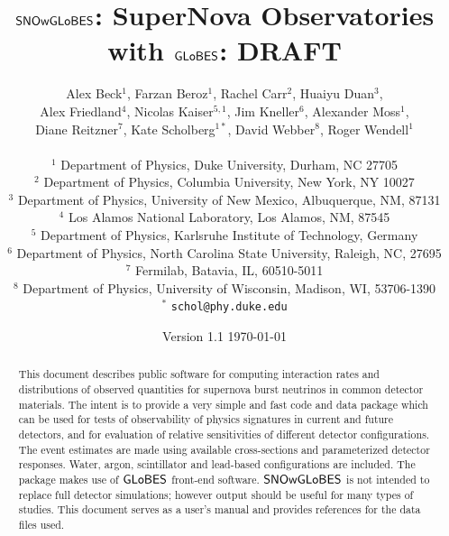 \documentclass[12pt]{article}
\newcommand{\globes}{\sf{GLoBES}}
\newcommand{\snowglobes}{\sf{SNOwGLoBES}}
\begin{document}
\title{\bf $\snowglobes$: SuperNova Observatories with $\globes$: DRAFT}
\author{Alex Beck$^1$,
Farzan Beroz$^1$,
Rachel Carr$^2$,
Huaiyu Duan$^3$,\\
Alex Friedland$^4$,
Nicolas Kaiser$^{5,1}$,
Jim Kneller$^6$,
Alexander Moss$^1$,\\
Diane Reitzner$^7$,
Kate Scholberg$^{1*}$,
David Webber$^8$,
Roger Wendell$^1$\\
~\\
\small
$^1$ Department of Physics, Duke University, Durham, NC 27705\\
\small
$^2$ Department of Physics, Columbia University, New York, NY 10027\\
\small
$^3$ Department of Physics, University of New Mexico, Albuquerque, NM, 87131\\
\small
$^4$ Los Alamos National Laboratory, Los Alamos, NM, 87545\\
\small
$^5$ Department of Physics, Karlsruhe Institute of Technology, Germany\\
\small
$^6$ Department of Physics, North Carolina State University, Raleigh, NC,  27695\\
\small
$^7$ Fermilab, Batavia, IL, 60510-5011\\
\small
$^8$ Department of Physics, University of Wisconsin, Madison, WI, 53706-1390\\
\small
$^*$ \texttt{schol@phy.duke.edu}\\
}

\date{Version 1.1 \today}

\maketitle 


\begin{abstract} 
This document describes public software
  for computing interaction rates and distributions of observed
  quantities for supernova burst neutrinos in common detector
  materials.  The intent is to provide a very simple and fast 
  code and data
  package which
  can be used for tests of observability of physics signatures in
  current and future detectors, and for evaluation of relative
  sensitivities of different detector configurations.  The event
  estimates are made using available cross-sections and
  parameterized detector responses.  Water, argon, scintillator
  and lead-based configurations are included.
  The package makes use of $\globes$
  front-end software.  $\snowglobes$ is not intended to replace full
  detector simulations; however output should be useful for many types
  of studies.  This document serves as a user's manual and provides 
  references for the data files used.

\end{abstract}
\end{document}
